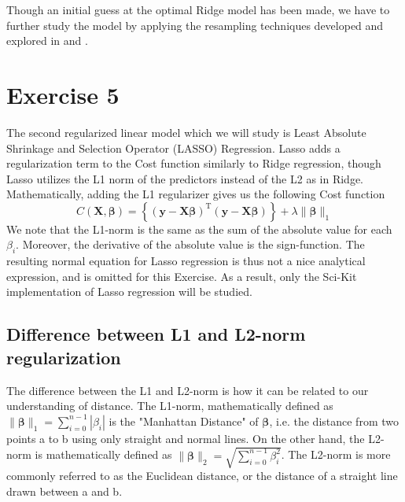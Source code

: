 \documentclass[11pt, a4paper]{article}
\begin{document}
Though an initial guess at the optimal Ridge model has been made, we have to further study the model by applying the resampling techniques developed and explored in  and .

\section*{Exercise 5}
The second regularized linear model which we will study is Least Absolute Shrinkage and Selection Operator (LASSO) Regression. Lasso adds a regularization term to the Cost function similarly to Ridge regression, though Lasso utilizes the L1 norm of the predictors instead of the L2 as in Ridge. \cite{Geron2019} Mathematically, adding the L1 regularizer gives us the following Cost function
\[
  C\left(\bm{X},\bm{\beta}\right) = \left\{\left(\bm{y}-\bm{X}\bm{\beta}\right)^\text{T}\left(\bm{y}-\bm{X}\bm{\beta}\right)\right\}+\lambda\lVert \bm{\beta}\rVert_1
\]
We note that the L1-norm is the same as the sum of the absolute value for each $\beta_i$. Moreover, the derivative of the absolute value is the sign-function. The resulting normal equation for Lasso regression is thus not a nice analytical expression, and is omitted for this Exercise. As a result, only the Sci-Kit implementation of Lasso regression will be studied.

\subsection*{Difference between L1 and L2-norm regularization}
The difference between the L1 and L2-norm is how it can be related to our understanding of distance. The L1-norm, mathematically defined as $\lVert \bm{\beta} \rVert_1 = \sum_{i=0}^{n-1}|\beta_i|$ is the "Manhattan Distance" of $\bm{\beta}$, i.e. the distance from two points a to b using only straight and normal lines. On the other hand, the L2-norm is mathematically defined as $\lVert \bm{\beta} \rVert_2 = \sqrt{\sum_{i=0}^{n-1}\beta_i^2}$. The L2-norm is more commonly referred to as the Euclidean distance, or the distance of a straight line drawn between a and b.
\end{document}
